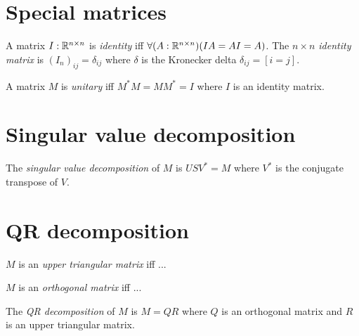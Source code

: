 \section{Special matrices}

%
%
A matrix \(I : \mathbb{R}^{n \times n}\) is \emph{identity} iff
\(\forall (A : \mathbb{R}^{n \times n}) (IA = AI = A)\).
The \emph{\(n\times n\) identity matrix} is
\((I_n)_{ij} = \delta_{ij}\) where \(\delta\) is the
%
Kronecker delta \(\delta_{ij} = [i=j]\).

A matrix \(M\) is
%
%
\emph{unitary} iff \(M^*M = MM^* = I\)
where \(I\) is an identity matrix.

\section{Singular value decomposition}

The
%
%
\emph{singular value decomposition} of \(M\) is \(U S V^* = M\) where \(V^*\) is the conjugate transpose of \(V\).

\section{QR decomposition}

\(M\) is an
%
%
\emph{upper triangular matrix} iff ...

\(M\) is an
%
%
\emph{orthogonal matrix} iff ...

The
%
%
\emph{QR decomposition} of \(M\) is \(M = QR\) where
\(Q\) is an orthogonal matrix and
\(R\) is an upper triangular matrix.
